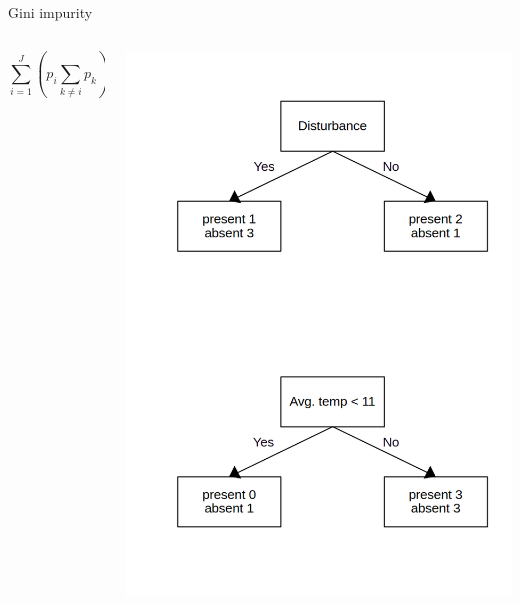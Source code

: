 \documentclass{irdbeamer}
\begin{document}
\begin{frame}{Gini impurity}
\begin{columns}
    \begin{column}{0.5\textwidth}
\centering
$$
\sum_{i=1}^J \left( p_i \sum_{k\neq i} p_k \right)
 = 1 - \sum^J_{i=1} p_i^2
 $$
    \end{column}
    \begin{column}{0.5\textwidth}
\centering
    \includegraphics[width=.8\textwidth]{./figs/schemas/gini.png}%
\end{column}
\end{columns}
\end{frame}
\end{document}
